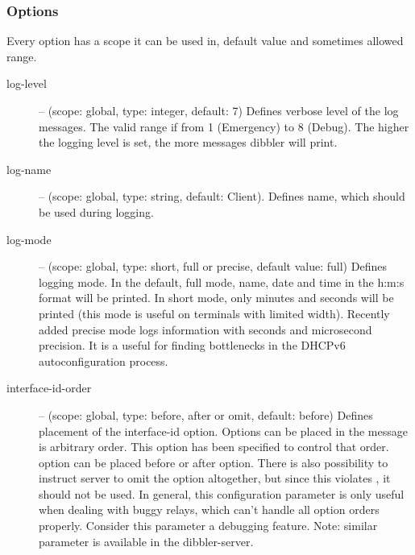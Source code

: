 \subsubsection{Options}

Every option has a scope it can be used in, default value and
sometimes allowed range.

\begin{description}
 \item[log-level] -- (scope: global, type: integer, default: 7) Defines
	    verbose level of the log messages. The valid range if
	    from 1 (Emergency) to 8 (Debug). The higher the logging
	    level is set, the more messages dibbler will print.
 \item[log-name] -- (scope: global, type: string, default: Client). Defines
	    name, which should be used during logging.
 \item[log-mode] -- (scope: global, type: short, full or precise,
	    default value: full) Defines logging mode. In the
	    default, full mode, name, date and time in the h:m:s format
	    will be printed. In short mode, only minutes and
	    seconds will be printed (this mode is useful on
	    terminals with limited width). Recently added precise
	    mode logs information with seconds and microsecond
	    precision. It is a useful for finding bottlenecks in
	    the DHCPv6 autoconfiguration process.
\item[interface-id-order] -- (scope: global, type: before, after or omit,
	default: before) Defines placement of the
	interface-id option. Options can be placed in the 
	message is arbitrary order. This option has been specified to control
	that order.  option can be placed before or after
	 option. There is also possibility to instruct
	server to omit the  option altogether, but since
	this violates \cite{rfc3315}, it should not be used. In general, this
	configuration parameter is only useful when dealing with buggy relays,
	which can't handle all option orders properly. Consider this parameter
	a debugging feature. Note: similar parameter is available in the dibbler-server.


\end{description}
